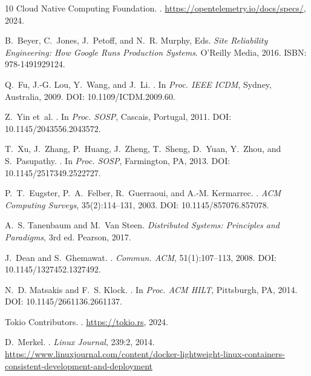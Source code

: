 \documentclass[journal]{IEEEtran}
\begin{document}
\begin{thebibliography}{10}
{Cloud Native Computing Foundation}.
.
\newblock \url{https://opentelemetry.io/docs/specs/}, 2024.

B.~Beyer, C.~Jones, J.~Petoff, and N.~R. Murphy, Eds.
\newblock \emph{Site Reliability Engineering: How Google Runs Production Systems}.
\newblock O'Reilly Media, 2016. ISBN: 978-1491929124.

Q.~Fu, J.-G. Lou, Y.~Wang, and J.~Li.
.
\newblock In \emph{Proc. IEEE ICDM}, Sydney, Australia, 2009.
\newblock DOI: 10.1109/ICDM.2009.60.


Z.~Yin et~al.
.
\newblock In \emph{Proc. SOSP}, Cascais, Portugal, 2011.
\newblock DOI: 10.1145/2043556.2043572.

T.~Xu, J.~Zhang, P.~Huang, J.~Zheng, T.~Sheng, D.~Yuan, Y.~Zhou, and S.~Pasupathy.
.
\newblock In \emph{Proc. SOSP}, Farmington, PA, 2013.
\newblock DOI: 10.1145/2517349.2522727.


P.~T.~Eugster, P.~A.~Felber, R.~Guerraoui, and A.-M. Kermarrec.
.
\newblock \emph{ACM Computing Surveys}, 35(2):114--131, 2003.
\newblock DOI: 10.1145/857076.857078.

A.~S. Tanenbaum and M.~Van Steen.
\newblock \emph{Distributed Systems: Principles and Paradigms}, 3rd ed.
\newblock Pearson, 2017.

J.~Dean and S.~Ghemawat.
.
\newblock \emph{Commun. ACM}, 51(1):107--113, 2008.
\newblock DOI: 10.1145/1327452.1327492.


N.~D. Matsakis and F.~S. Klock.
.
\newblock In \emph{Proc. ACM HILT}, Pittsburgh, PA, 2014.
\newblock DOI: 10.1145/2661136.2661137.

{Tokio Contributors}.
.
\newblock \url{https://tokio.rs}, 2024.

D.~Merkel.
.
\newblock \emph{Linux Journal}, 239:2, 2014.
\newblock \url{https://www.linuxjournal.com/content/docker-lightweight-linux-containers-consistent-development-and-deployment}

\end{thebibliography}
\end{document}
